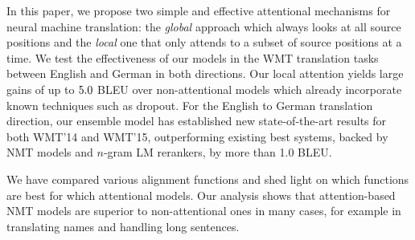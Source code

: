 In this paper, we propose two simple and effective attentional mechanisms for
neural machine translation: the {\it global} approach which always looks at all
source positions and the {\it local} one that only attends to a subset of source
positions at a time. We test the effectiveness of our models in the WMT
translation tasks between English and German in both directions. 
Our local attention yields large gains of up to
$5.0{}$ BLEU over non-attentional models which already incorporate known
techniques such as dropout. For the English to German translation direction, our
ensemble model has established new state-of-the-art
results for both WMT'14 and WMT'15, outperforming existing
best systems, backed by NMT models and $n$-gram LM rerankers, by more than 1.0 BLEU.

We have compared various alignment functions and shed light on which functions
are best for which attentional models.
Our analysis shows that attention-based NMT models are superior to
non-attentional ones in many cases, for example in translating names and
handling long
sentences.
